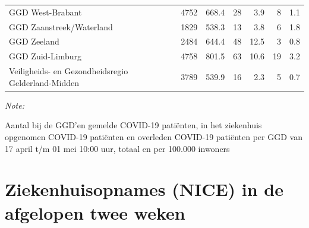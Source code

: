 \documentclass[
  english,
  man,floatsintext]{apa6}
\begin{document}
\begin{table}
\begin{threeparttable}
\begin{tabular}{lrrrrrr}
GGD West-Brabant & 4752 & 668.4 & 28 & 3.9 & 8 & 1.1\\
GGD Zaanstreek/Waterland & 1829 & 538.3 & 13 & 3.8 & 6 & 1.8\\
GGD Zeeland & 2484 & 644.4 & 48 & 12.5 & 3 & 0.8\\
GGD Zuid-Limburg & 4758 & 801.5 & 63 & 10.6 & 19 & 3.2\\
Veiligheids- en Gezondheidsregio Gelderland-Midden & 3789 & 539.9 & 16 & 2.3 & 5 & 0.7\\
\bottomrule
\end{tabular}
\begin{tablenotes}
\item \textit{Note: } 
\item Aantal bij de GGD’en gemelde COVID-19 patiënten, in het ziekenhuis opgenomen COVID-19 patiënten en overleden COVID-19 patiënten per GGD van 17 april t/m 01 mei 10:00 uur, totaal en per 100.000 inwoners
\end{tablenotes}
\end{threeparttable}
\endgroup{}
\end{table}

\newpage

\hypertarget{ziekenhuisopnames-nice-in-de-afgelopen-twee-weken}{%
\section{Ziekenhuisopnames (NICE) in de afgelopen twee weken}\label{ziekenhuisopnames-nice-in-de-afgelopen-twee-weken}}
\end{document}
